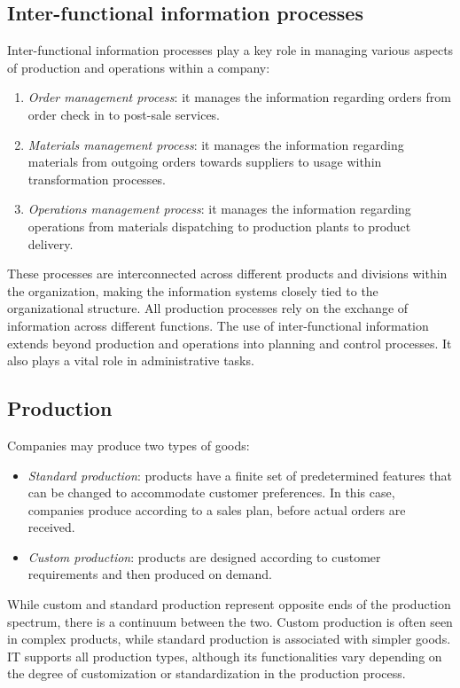 \subsection{Inter-functional information processes}
Inter-functional information processes play a key role in managing various aspects of production and operations within a company: 
\begin{enumerate}
    \item \textit{Order management process}: it manages the information regarding orders from order check in to post-sale services.
    \item \textit{Materials management process}: it manages the information regarding materials from outgoing orders towards suppliers to usage within transformation processes.
    \item \textit{Operations management process}: it manages the information regarding operations from materials dispatching to production plants to product delivery.
\end{enumerate}
\noindent These processes are interconnected across different products and divisions within the organization, making the information systems closely tied to the organizational structure. 
All production processes rely on the exchange of information across different functions. 
The use of inter-functional information extends beyond production and operations into planning and control processes. 
It also plays a vital role in administrative tasks.

\subsection{Production}
Companies may produce two types of goods: 
\begin{itemize}
    \item \textit{Standard production}: products have a finite set of predetermined features that can be changed to accommodate customer preferences. 
        In this case, companies produce according to a sales plan, before actual orders are received.
    \item \textit{Custom production}: products are designed according to customer requirements and then produced on demand.
\end{itemize}
\noindent While custom and standard production represent opposite ends of the production spectrum, there is a continuum between the two. 
Custom production is often seen in complex products, while standard production is associated with simpler goods. 
IT supports all production types, although its functionalities vary depending on the degree of customization or standardization in the production process.

